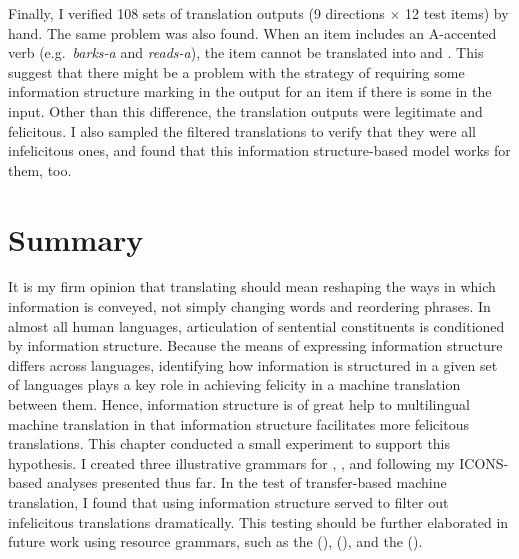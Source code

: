 Finally, I verified 108 sets of translation outputs (9 directions
\ensuremath{\times} 12 test items) by hand. The same problem was also
found. When an  item includes an A-accented verb
(e.g.\ \textit{barks-a} and \textit{reads-a}), the item
cannot be translated into  and . This
suggest that there might be a problem with the strategy of requiring
some information structure marking in the output for an item if there
is some in the input.  Other than this difference, the translation
outputs were legitimate and felicitous.  I also sampled the filtered
translations to verify that they were all infelicitous ones, and found
that this information structure-based model works for them, too.




\section{Summary}
\label{13:sec:sum}

It is my firm opinion that translating should mean reshaping the ways
in which information is conveyed, not simply changing words and
reordering phrases.  In almost all human languages, articulation of
sentential constituents is conditioned by information
structure. Because the means of expressing information structure
differs across languages, identifying how information is structured in
a given set of languages plays a key role in achieving felicity in a
machine translation between them. Hence, information
structure is of great help to multilingual machine translation in that
information structure facilitates more felicitous translations.  This
chapter conducted a small experiment to support this
hypothesis. I created three illustrative
grammars for , , and  following my
ICONS-based analyses presented thus far. In the test of transfer-based
machine translation, I found that using information
structure served to filter out infelicitous translations
dramatically. This testing should be further elaborated in future work
using resource grammars, such as the 
(\citealt{flickinger:00}),  (\citealt{siegel:bender:02}),
and the  (\citealt{kim:etal:11}).



